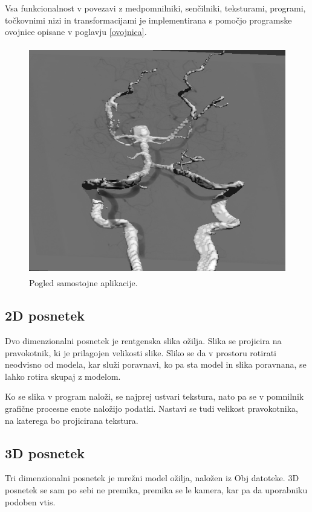 \documentclass[a4paper, 12pt]{book}
\begin{document}
Vsa funkcionalnost v povezavi z medpomnilniki, senčilniki, teksturami, programi, točkovnimi nizi in transformacijami je implementirana s pomočjo programske ovojnice opisane v poglavju \ref{ovojnica}.

\begin{figure}[h]
\begin{center}
\includegraphics[width=12cm, height=10cm, keepaspectratio=true]{Samostojna_aplikacija.png}
\end{center}
\caption{Pogled samostojne aplikacije.}
\label{samostojnaaplikacija}
\end{figure}


\subsection{2D posnetek}

Dvo dimenzionalni posnetek je rentgenska slika ožilja. Slika se projicira na pravokotnik, ki je prilagojen velikosti slike. Sliko se da v prostoru rotirati neodvisno od modela, kar služi poravnavi, ko pa sta model in slika poravnana, se lahko rotira skupaj z modelom.

Ko se slika v program naloži, se najprej ustvari tekstura, nato pa se v pomnilnik grafične procesne enote naložijo podatki. Nastavi se tudi velikost pravokotnika, na katerega bo projicirana tekstura.

\subsection{3D posnetek}

Tri dimenzionalni posnetek je mrežni model ožilja, naložen iz Obj datoteke. 3D posnetek se sam po sebi ne premika, premika se le kamera, kar pa da uporabniku podoben vtis.
\end{document}
